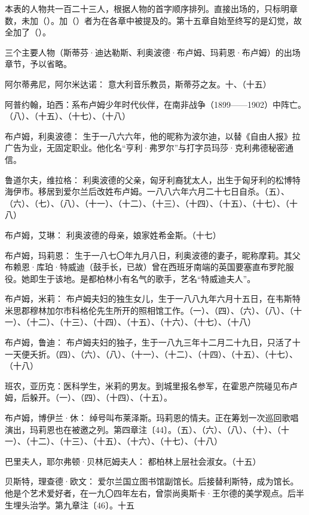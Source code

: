 \par 本表的人物共一百二十三人，根据人物的首字顺序排列。直接出场的，只标明章数，未加（）。加（）者为在各章中被提及的。第十五章自始至终写的是幻觉，故全加了（）。
\par 三个主要人物（斯蒂芬·迪达勒斯、利奥波德·布卢姆、玛莉恩·布卢姆）的出场章节，予以省略。
\par 阿尔蒂弗尼，阿尔米达诺： 意大利音乐教员，斯蒂芬之友。十、（十五）
\par 阿普约翰，珀西：系布卢姆少年时代伙伴，在南非战争（1899——1902）中阵亡。（八）、（十五）、（十七）、（十八）
\par 布卢姆，利奥波德： 生于一八六六年，他的昵称为波尔迪，以替《自由人报》拉广告为业，无固定职业。他化名“亨利·弗罗尔”与打字员玛莎·克利弗德秘密通信。
\par 鲁道尔夫，维拉格： 利奥波德的父亲，匈牙利裔犹太人，出生于匈牙利的松博特海伊市。移居到爱尔兰后改姓布卢姆。一八八六年六月二十七日自杀。（五）、（六）、（七）、（八）、（十一）、（十二）、（十三）、（十四）、（十五）、（十七）、（十八）
\par 布卢姆，艾琳： 利奥波德的母亲，娘家姓希金斯。（十七）
\par 布卢姆，玛莉恩： 生于一八七〇年九月八日，利奥波德的妻子，昵称摩莉。其父布赖恩·库珀·特威迪（鼓手长，已故）曾在西班牙南端的英国要塞直布罗陀服役。她即生于该地。是都柏林小有名气的歌手，艺名“特威迪夫人”。
\par 布卢姆，米莉： 布卢姆夫妇的独生女儿，生于一八八九年六月十五日，在韦斯特米思郡穆林加尔市科格伦先生所开的照相馆工作。（一）、（四）、（六）、（八）、（十一）、（十二）、（十三）、（十四）、（十五）、（十六）、（十七）、（十八）
\par 布卢姆，鲁迪： 布卢姆夫妇的独子，生于一八九三年十二月二十九日，只活了十一天便夭折。（四）、（六）、（八）、（十一）、（十二）、（十四）、（十五）、（十七）、（十八）
\par 班农，亚历克：医科学生，米莉的男友。到城里报名参军，在霍恩产院碰见布卢姆，后躲开。（一）、（四）、（十四）、（十五）。
\par 布卢姆，博伊兰·休： 绰号叫布莱泽斯。玛莉恩的情夫。正在筹划一次巡回歌唱演出，玛莉恩也在被邀之列。第四章注〔44〕。（五）、（六）、（八）、（十）、（十一）、（十二）、（十三）、（十五）、（十六）、（十七）、（十八）
\par 巴里夫人，耶尔弗顿·贝林厄姆夫人： 都柏林上层社会淑女。（十五）
\par 贝斯特，理查德·欧文： 爱尔兰国立图书馆副馆长。后接替利斯特，成为馆长。他是个艺术爱好者，在一九〇四年左右，曾崇尚奥斯卡·王尔德的美学观点。后半生埋头治学。第九章注〔46〕。十五
